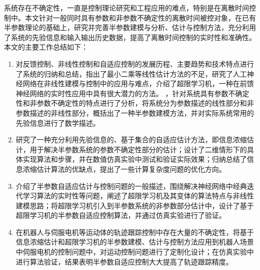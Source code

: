 
\begin{conclusion}

系统存在不确定性，一直是控制理论研究和工程应用的难点，特别是在离散时间控制中。本文针对一般同时具有参数和非参数不确定性的离散时间被控对象，在已有半参数理论的基础上，研究并完善半参数建模与分析、估计与控制方法，充分利用了系统的先验信息和输入输出历史数据，提高了离散时间控制的实时性和准确性。本文的主要工作总结如下：
\begin{enumerate}
\item 对反馈控制、非线性控制和自适应控制的发展历程、主要趋势和技术特点进行了系统的归纳和总结，指出了最小二乘等线性估计方法的不足，研究了人工神经网络在非线性建模与控制中的应用与难点，介绍了超限学习机，一种在前馈神经网络的实时性应用中具有很大潜力的方法。
，针对系统具有参数不确定性和非参数不确定性的特点进行了分析，将系统分为参数描述的线性部分和非参数描述的非线性部分，概括出了一种半参数建模方法，并对实际系统常用的先验信息进行了数学描述。
\item 研究了一种充分利用先验信息的、基于集合的自适应估计方法，即信息浓缩估计，用于解决半参数系统的参数不确定性部分的估计；设计了二维情形下的具体实现算法和步骤，并在数值仿真实验中测试和验证实际效果；归纳总结了信息浓缩估计算法的优缺点，提出了一些计算复杂度问题的优化方向。
\item 介绍了半参数自适应估计与控制问题的一般描述，围绕解决神经网络中经典迭代学习算法的实时性等问题，阐述了超限学习机及其变体的算法特点与非线性建模思路；将超限学习机引入到半参数系统的非参数部分估计中，设计了基于超限学习机的半参数自适应控制算法，并通过仿真实验进行了验证。
\item 在机器人与伺服电机等运动体的轨迹跟踪控制中存在大量的不确定性，将基于信息浓缩估计和超限学习机的半参数建模、估计与控制方法应用到机器人场景中伺服电机的控制问题中，对运动控制问题进行了定制化设计；在仿真实验中进行算法验证，结果表明半参数自适应控制大大提高了轨迹跟踪精度。
\end{enumerate}


\end{conclusion}
